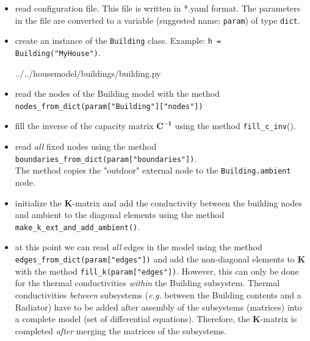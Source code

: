 \begin{itemize}
	\item read configuration file. This file is written in \textsf{*.yaml} format. The parameters in the file are converted to a variable (suggested name: \texttt{param}) of type \texttt{dict}.
	\item create an instance of the \texttt{Building} class. Example: \texttt{h = Building("MyHouse")}.
	
	 
	{../../housemodel/buildings/building.py}
	
	\item read the nodes of the Building model with the method \texttt{nodes\_from\_dict(param["Building"]["nodes"])}
	\item fill the inverse of the capacity matrix $\mathbf{C^{-1}}$ using the method \texttt{fill\_c\_inv}().
	\item read \emph{all} fixed nodes using the method \texttt{boundaries\_from\_dict(param["boundaries"])}. \\ The method copies the "outdoor" external node to the \texttt{Building.ambient} node.
	\item initialize the $\mathbf{K}$-matrix and add the conductivity between the building nodes and ambient to the diagonal elements using the method \texttt{make\_k\_ext\_and\_add\_ambient()}.
	\item at this point we can read \emph{all} edges in the model using the method \texttt{edges\_from\_dict(param["edges"])} and add the non-diagonal elements to $\mathbf{K}$ with the method \texttt{fill\_k(param["edges"])}. However, this can only be done for the thermal conductivities \emph{within} the Building subsystem. Thermal conductivities \emph{between} subsystems (\textit{e.g.} between the Building contents and a Radiator) have to be added after assembly of the subsystems (matrices) into a complete model (set of differential equations). Therefore, the $\mathbf{K}$-matrix is completed \emph{after} merging the matrices of the subsystems. 
\end{itemize}

